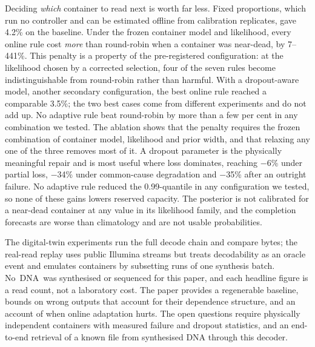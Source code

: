 \documentclass[conference,onecolumn,11pt]{IEEEtran}
\begin{document}
Deciding \emph{which} container to read next is worth far less.  Fixed proportions, which run no
controller and can be estimated offline from calibration replicates, gave 4.2\% on the baseline.  Under
the frozen container model and likelihood, every online rule cost \emph{more} than round-robin when a
container was near-dead, by 7--441\%.  This penalty is a property of the pre-registered configuration:
at the likelihood chosen by a corrected selection, four of the seven rules become indistinguishable from
round-robin rather than harmful.  With a dropout-aware model, another secondary configuration, the best
online rule reached a comparable 3.5\%; the two best cases come from different experiments and do not
add up.  No adaptive rule beat round-robin by more than a few per cent in any combination we tested.  The
ablation shows that the penalty requires the frozen combination of container model, likelihood and prior
width, and that relaxing any one of the three removes most of it.  A dropout parameter is the physically
meaningful repair and is most useful where loss dominates, reaching $-$6\% under partial loss, $-$34\%
under common-cause degradation and $-$35\% after an outright failure.  No adaptive rule reduced the
0.99-quantile in any configuration we tested, so none of these gains lowers reserved capacity.  The
posterior is not calibrated for a near-dead container at any value in its likelihood family, and the
completion forecasts are worse than climatology and are not usable probabilities.

The digital-twin experiments run the full decode chain and compare bytes; the real-read replay uses
public Illumina streams but treats decodability as an oracle event and emulates containers by subsetting
runs of one synthesis batch.  No~DNA~was synthesised or sequenced for this paper, and each headline
figure is a read count, not a laboratory cost.  The paper provides a regenerable baseline, bounds on
wrong outputs that account for their dependence structure, and an account of when online adaptation
hurts.  The open questions require physically independent containers with measured failure and dropout
statistics, and an end-to-end retrieval of a known file from synthesised DNA through this decoder.

\appendices
\end{document}
